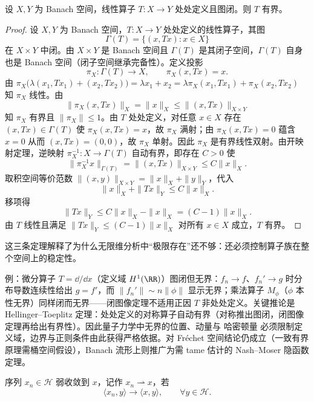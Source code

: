 \begin{proposition}[由开映射定理得到闭图定理]
设 $X,Y$ 为 Banach 空间，线性算子 $T:X\to Y$ 处处定义且图闭。则 $T$ 有界。
\end{proposition}
\begin{proof}
设 $X,Y$ 为 Banach 空间，$T:X\to Y$ 处处定义的线性算子，其图
\begin{equation*}
\Gamma(T)=\{(x,Tx):x\in X\}
\end{equation*}
在 $X\times Y$ 中闭。由 $X\times Y$ 是 Banach 空间且 $\Gamma(T)$ 是其闭子空间，$\Gamma(T)$ 自身也是 Banach 空间（闭子空间继承完备性）。定义投影
\begin{equation*}
\pi_X:\Gamma(T)\to X,
\qquad
\pi_X(x,Tx)=x.
\end{equation*}
由 $\pi_X\bigl(\lambda(x_1,Tx_1)+(x_2,Tx_2)\bigr)=\lambda x_1+x_2=\lambda\pi_X(x_1,Tx_1)+\pi_X(x_2,Tx_2)$ 知 $\pi_X$ 线性。由
\begin{equation*}
\|\pi_X(x,Tx)\|_X=\|x\|_X\le\|(x,Tx)\|_{X\times Y}
\end{equation*}
知 $\pi_X$ 有界且 $\|\pi_X\|\le1$。由 $T$ 处处定义，对任意 $x\in X$ 存在 $(x,Tx)\in\Gamma(T)$ 使 $\pi_X(x,Tx)=x$，故 $\pi_X$ 满射；由 $\pi_X(x,Tx)=0$ 蕴含 $x=0$ 从而 $(x,Tx)=(0,0)$，故 $\pi_X$ 单射。因此 $\pi_X$ 是有界线性双射。由开映射定理，逆映射 $\pi_X^{-1}:X\to\Gamma(T)$ 自动有界，即存在 $C>0$ 使
\begin{equation*}
\|\pi_X^{-1}x\|_{\Gamma(T)}
=\|(x,Tx)\|_{X\times Y}
\le C\|x\|_X.
\end{equation*}
取积空间等价范数 $\|(x,y)\|_{X\times Y}=\|x\|_X+\|y\|_Y$，代入
\begin{equation*}
\|x\|_X+\|Tx\|_Y\le C\|x\|_X.
\end{equation*}
移项得
\begin{equation*}
\|Tx\|_Y\le C\|x\|_X-\|x\|_X=(C-1)\|x\|_X.
\end{equation*}
由 $T$ 线性且满足 $\|Tx\|_Y\le(C-1)\|x\|_X$ 对所有 $x\in X$ 成立，$T$ 有界。
\end{proof}


这三条定理解释了为什么无限维分析中“极限存在”还不够：还必须控制算子族在整个空间上的稳定性。

例：微分算子 $T=\dd/\dd x$（定义域 $H^1(\RR)$）图闭但无界：$f_n\to f$、$f_n'\to g$ 时分布导数连续性给出 $g=f'$，而 $\|f_n'\|\sim n\|\phi\|$ 显示无界；乘法算子 $M_\phi$（$\phi$ 本性无界）同样闭而无界——闭图像定理不适用正因 $T$ 非处处定义。关键推论是 Hellinger--Toeplitz 定理：处处定义的对称算子自动有界（对称推出图闭，闭图像定理再给出有界性）。因此量子力学中无界的位置、动量与 哈密顿量 必须限制定义域，边界与正则条件由此获得严格依据。对 Fr\'echet 空间结论仍成立（一致有界原理需桶空间假设），Banach 流形上则推广为需 tame 估计的 Nash--Moser 隐函数定理。
\begin{definition}[弱收敛]
序列 $x_n\in\mathcal H$ 弱收敛到 $x$，记作 $x_n\rightharpoonup x$，若
\[
\langle x_n,y\rangle\to\langle x,y\rangle,
\qquad \forall y\in\mathcal H.
\]
\end{definition}

